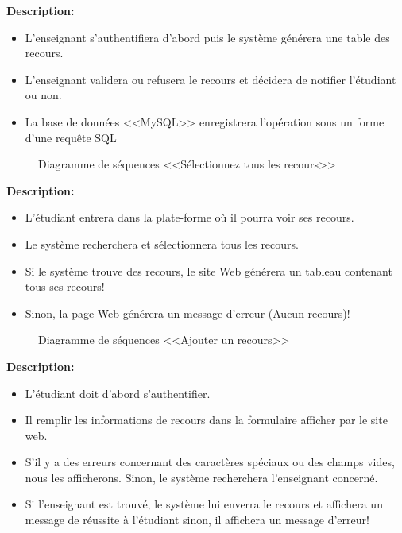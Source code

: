 \documentclass[12pt]{report}
\begin{document}
\textbf{Description:}

\begin{itemize}
    \item L'enseignant s'authentifiera d'abord puis le système générera une table des recours.
    \item L'enseignant validera ou refusera le recours et décidera de notifier l'étudiant ou non.
    \item La base de données <<MySQL>> enregistrera l'opération sous un forme d'une requête SQL
\end{itemize}

\newpage

\begin{figure}[h]
\centering
    \caption{Diagramme de séquences <<Sélectionnez tous les recours>>}
\end{figure}

\vspace{0.3in}

\textbf{Description:}

\begin{itemize}
    \item L'étudiant entrera dans la plate-forme où il pourra voir ses recours.
    \item Le système recherchera et sélectionnera tous les recours. 
    \item Si le système trouve des recours, le site Web générera un tableau contenant tous ses recours!
    \item Sinon, la page Web générera un message d'erreur (Aucun recours)!
\end{itemize}

\newpage

\begin{figure}[h]
\centering
    \caption{Diagramme de séquences <<Ajouter un recours>>}
\end{figure}

\textbf{Description:}

\begin{itemize}
    \item L'étudiant doit d'abord s'authentifier.
    \item Il remplir les informations de recours dans la formulaire afficher par le site web.
    \item S'il y a des erreurs concernant des caractères spéciaux ou des champs vides, nous les afficherons. Sinon, le système recherchera l'enseignant concerné.
    \item Si l'enseignant est trouvé, le système lui enverra le recours et affichera un message de réussite à l'étudiant sinon, il affichera un message d'erreur!
\end{itemize}
\end{document}
